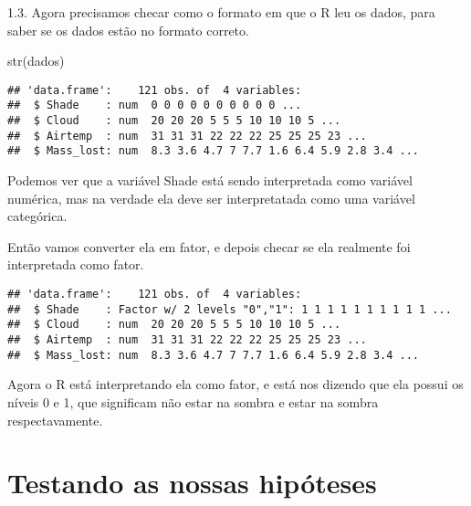 \documentclass[
]{article}
\newenvironment{Shaded}{\begin{snugshade}}{\end{snugshade}}
\newcommand{\FunctionTok}[1]{\textcolor[rgb]{0.00,0.00,0.00}{#1}}
\newcommand{\NormalTok}[1]{#1}
\newcommand{\OtherTok}[1]{\textcolor[rgb]{0.56,0.35,0.01}{#1}}
\newcommand{\SpecialCharTok}[1]{\textcolor[rgb]{0.00,0.00,0.00}{#1}}
\begin{document}
1.3. Agora precisamos checar como o formato em que o R leu os dados,
para saber se os dados estão no formato correto.

\begin{Shaded}
\begin{Highlighting}[]
\FunctionTok{str}\NormalTok{(dados)}
\end{Highlighting}
\end{Shaded}

\begin{verbatim}
## 'data.frame':    121 obs. of  4 variables:
##  $ Shade    : num  0 0 0 0 0 0 0 0 0 0 ...
##  $ Cloud    : num  20 20 20 5 5 5 10 10 10 5 ...
##  $ Airtemp  : num  31 31 31 22 22 22 25 25 25 23 ...
##  $ Mass_lost: num  8.3 3.6 4.7 7 7.7 1.6 6.4 5.9 2.8 3.4 ...
\end{verbatim}

Podemos ver que a variável Shade está sendo interpretada como variável
numérica, mas na verdade ela deve ser interpretatada como uma variável
categórica.

Então vamos converter ela em fator, e depois checar se ela realmente foi
interpretada como fator.

\begin{Shaded}
\end{Shaded}

\begin{verbatim}
## 'data.frame':    121 obs. of  4 variables:
##  $ Shade    : Factor w/ 2 levels "0","1": 1 1 1 1 1 1 1 1 1 1 ...
##  $ Cloud    : num  20 20 20 5 5 5 10 10 10 5 ...
##  $ Airtemp  : num  31 31 31 22 22 22 25 25 25 23 ...
##  $ Mass_lost: num  8.3 3.6 4.7 7 7.7 1.6 6.4 5.9 2.8 3.4 ...
\end{verbatim}

Agora o R está interpretando ela como fator, e está nos dizendo que ela
possui os níveis 0 e 1, que significam não estar na sombra e estar na
sombra respectavamente.

\hypertarget{testando-as-nossas-hipuxf3teses}{%
\section{Testando as nossas
hipóteses}\label{testando-as-nossas-hipuxf3teses}}
\end{document}
